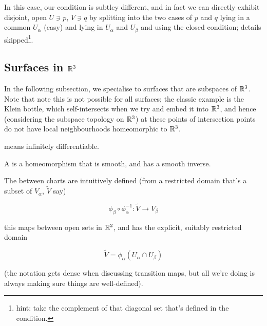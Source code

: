 \documentclass[11pt]{scrartcl}
\begin{document}
In this case, our condition is subtley different, and in fact we can directly exhibit disjoint, open $U \ni p$, $V \ni q$ by splitting into the two cases of $p$ and $q$ lying in a common $U_\alpha$ (easy) and lying in $U_\alpha$ and $U_\beta$ and using the closed condition; details skipped\footnote{hint: take the complement of that diagonal set that's defined in the condition.}.


\subsection{Surfaces in $\mathbb R^3$}

In the following subsection, we specialise to surfaces that are subspaces of $\mathbb R^3$. Note that note this is not possible for all surfaces; the classic example is the Klein bottle, which self-intersects when we try and embed it into $\mathbb R^3$, and hence (considering the subspace topology on $\mathbb R^3$) at these points of intersection points do not have local neighbourhoods homeomorphic to $\mathbb R^3$.

\begin{definition}
 means infinitely differentiable.
\end{definition}

\begin{definition}
A  is a homeomorphism that is smooth, and has a smooth inverse.
\end{definition}

\begin{definition}

The  between charts are intuitively defined (from a restricted domain that's a subset of $V_\alpha$, $\tilde{V}$ say)

\begin{equation}
    \phi_\beta \circ \phi_\alpha^{-1} : \tilde{V} \rightarrow V_\beta
\end{equation}

this maps between open sets in $\mathbb R^2$, and has the explicit, suitably restricted domain

\begin{equation}
    \tilde{V} = \phi_\alpha(U_\alpha \cap U_\beta)
\end{equation}

(the notation gets dense when discussing transition maps, but all we're doing is always making sure things are well-defined).
\end{definition}
\end{document}

